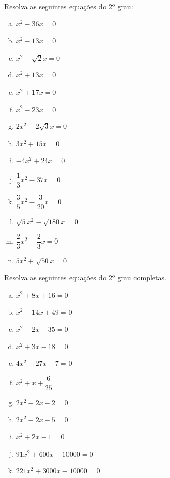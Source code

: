 \begin{exer}
Resolva as seguintes equações do 2º grau:
\begin{multicols}{3}
\begin{enumerate}[a)]
\item $x^2 - 36x=0$
\item $x^2 - 13x=0$
\item $x^2 - \sqrt{2}x=0$
\item $x^2 + 13x=0$
\item $x^2 + 17x=0$
\item $x^2 - 23x=0$
\item $2x^2 - 2\sqrt{3}x= 0$
\item $3x^2 + 15x=0$
\item $-4x^2 + 24x=0$
\item $\dfrac{1}{3}x^2 - 37x=0$
\item $\dfrac{3}{5}x^2 - \dfrac{3}{20}x=0$
\item $\sqrt{5}x^2 - \sqrt{180}x=0$
\item $\dfrac{2}{3}x^2 - \dfrac{2}{3}x=0$
\item $5x^2 + \sqrt{50}x= 0$
\end{enumerate}
\end{multicols}
\end{exer}

\begin{exer}
Resolva as seguintes equações do 2º grau completas.
\begin{multicols}{2}
\begin{enumerate}[a)]
\item $x^2 + 8x + 16=0$
\item $x^2 - 14x + 49=0$
\item $x^2 - 2x - 35=0$
\item $x^2 + 3x - 18=0$
\item $4x^2 - 27x - 7=0$
\item $x^2 + x + \dfrac{6}{25}$
\item $2x^2 - 2x - 2=0$
\item $2x^2 - 2x - 5=0$
\item $x^2 + 2x - 1=0$
\item $91x^2 + 600x - 10000=0$
\item $221x^2 + 3000x - 10000=0$
\end{enumerate}
\end{multicols}
\end{exer}


